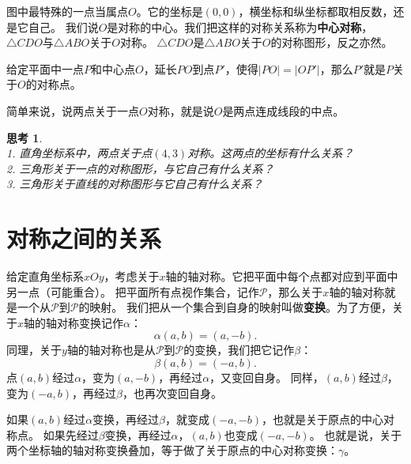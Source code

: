 \documentclass[12pt,UTF8]{ctexbook}
\newtheorem{sk}{思考}[section]
\begin{document}
图中最特殊的一点当属点$O$。它的坐标是$(0,0)$，横坐标和纵坐标都取相反数，还是它自己。
我们说$O$是对称的中心。我们把这样的对称关系称为\textbf{中心对称}，$\triangle CDO$与$\triangle ABO$关于$O$对称。
$\triangle CDO$是$\triangle ABO$关于$O$的对称图形，反之亦然。

给定平面中一点$P$和中心点$O$，延长$PO$到点$P'$，使得$|PO| = |OP'|$，那么$P'$就是$P$关于$O$的对称点。

简单来说，说两点关于一点$O$对称，就是说$O$是两点连成线段的中点。

\begin{sk}\label{sk:4-1-0}
    \mbox{} \\
    1. 直角坐标系中，两点关于点$(4,3)$对称。这两点的坐标有什么关系？\\
    2. 三角形关于一点的对称图形，与它自己有什么关系？\\
    3. 三角形关于直线的对称图形与它自己有什么关系？
\end{sk}

\section{对称之间的关系}
给定直角坐标系$xOy$，考虑关于$x$轴的轴对称。它把平面中每个点都对应到平面中另一点（可能重合）。
把平面所有点视作集合，记作$\mathcal{P}$，那么关于$x$轴的轴对称就是一个从$\mathcal{P}$到$\mathcal{P}$的映射。
我们把从一个集合到自身的映射叫做\textbf{变换}。为了方便，关于$x$轴的轴对称变换记作$\alpha$：
$$ \alpha (a, b) = (a, -b).$$
同理，关于$y$轴的轴对称也是从$\mathcal{P}$到$\mathcal{P}$的变换，我们把它记作$\beta$：
$$ \beta (a, b) = (-a, b).$$
点$(a, b)$经过$\alpha$，变为$(a, -b)$，再经过$\alpha$，又变回自身。
同样，$(a, b)$经过$\beta$，变为$(-a, b)$，再经过$\beta$，也再次变回自身。

如果$(a, b)$经过$\alpha$变换，再经过$\beta$，就变成$(-a, -b)$，也就是关于原点的中心对称点。
如果先经过$\beta$变换，再经过$\alpha$，$(a, b)$也变成$(-a, -b)$。
也就是说，关于两个坐标轴的轴对称变换叠加，等于做了关于原点的中心对称变换：$\gamma$。
\end{document}
